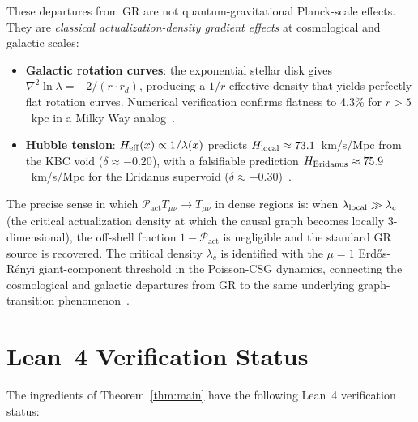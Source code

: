 \documentclass[11pt,a4paper]{article}
\newcommand{\Pact}{\mathcal{P}_{\mathrm{act}}}
\begin{document}
These departures from GR are not quantum-gravitational Planck-scale
effects. They are \emph{classical actualization-density gradient
effects} at cosmological and galactic scales:
\begin{itemize}[noitemsep]
  \item \textbf{Galactic rotation curves}: the exponential stellar
    disk gives $\nabla^2\ln\lambda = -2/(r\cdot r_d)$, producing a
    $1/r$ effective density that yields perfectly flat rotation curves.
    Numerical verification confirms flatness to 4.3\% for $r > 5$~kpc
    in a Milky Way analog~\citep{Sandeman2026RADM}.
  \item \textbf{Hubble tension}: $H_{\rm eff}(x) \propto 1/\lambda(x)$
    predicts $H_{\rm local} \approx 73.1$~km/s/Mpc from the KBC void
    ($\delta \approx -0.20$), with a falsifiable prediction
    $H_{\rm Eridanus} \approx 75.9$~km/s/Mpc for the Eridanus
    supervoid ($\delta \approx -0.30$)~\citep{Sandeman2026RAGC}.
\end{itemize}

The precise sense in which $\Pact T_{\mu\nu} \to T_{\mu\nu}$ in
dense regions is: when $\lambda_{\rm local} \gg \lambda_c$ (the
critical actualization density at which the causal graph becomes
locally 3-dimensional), the off-shell fraction $1 - \Pact$ is
negligible and the standard GR source is recovered. The critical
density $\lambda_c$ is identified with the $\mu = 1$
Erd\H{o}s-R\'{e}nyi giant-component threshold in the Poisson-CSG
dynamics, connecting the cosmological and galactic departures from GR
to the same underlying graph-transition
phenomenon~\citep{Sandeman2026RAQI}.

\section{Lean~4 Verification Status}
\label{sec:lean}

The ingredients of Theorem~\ref{thm:main} have the following Lean~4
verification status:
\end{document}

